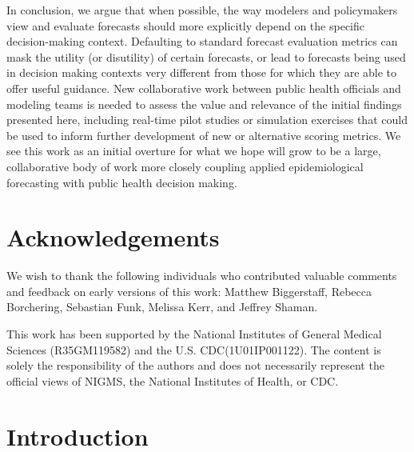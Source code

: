 \documentclass{article}\usepackage[]{graphicx}\usepackage[]{xcolor}
\begin{document}
In conclusion, we argue that when possible, the way modelers and policymakers view and evaluate forecasts should more explicitly depend on
the specific decision-making context. Defaulting to standard forecast evaluation metrics can mask the utility (or
disutility) of certain forecasts, or lead to forecasts being used in decision making contexts very different from those
for which they are able to offer useful guidance. New collaborative work between public health officials and modeling teams is
needed to assess the value and relevance of the initial findings presented here, including real-time pilot studies or
simulation exercises that could be used to inform further development of new or alternative scoring metrics. We see this
work as an initial overture for what we hope will grow to be a large, collaborative body of work more closely coupling
applied epidemiological forecasting with public health decision making.

\section*{Acknowledgements}

We wish to thank the following individuals who contributed valuable comments and feedback on early versions of this
work: Matthew Biggerstaff, Rebecca Borchering, Sebastian Funk, Melissa Kerr, and Jeffrey Shaman.

This work has been supported by the National Institutes of General Medical Sciences (R35GM119582) and the U.S.
CDC(1U01IP001122). The content is solely the responsibility of the authors and does not necessarily represent the
official views of NIGMS, the National Institutes of Health, or CDC.

\appendix
\appendixpage
\addappheadtotoc

\section{Introduction}
\label{sec:intro}
\end{document}
